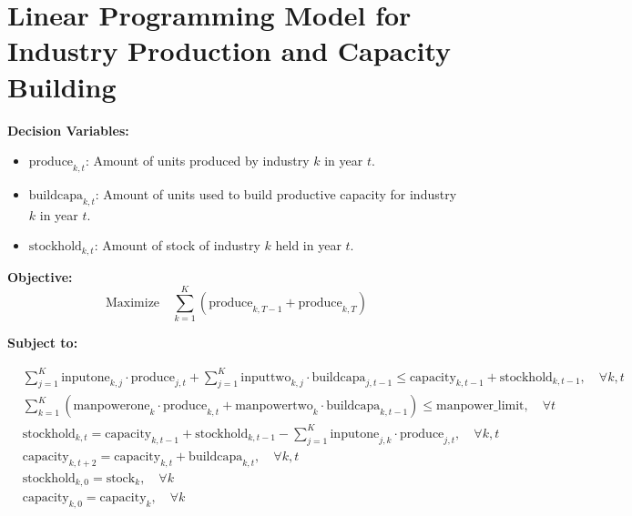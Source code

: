 \documentclass{article}
\begin{document}
\section*{Linear Programming Model for Industry Production and Capacity Building}

\textbf{Decision Variables:}
\begin{itemize}
    \item \( \text{produce}_{k, t} \): Amount of units produced by industry \( k \) in year \( t \).
    \item \( \text{buildcapa}_{k, t} \): Amount of units used to build productive capacity for industry \( k \) in year \( t \).
    \item \( \text{stockhold}_{k, t} \): Amount of stock of industry \( k \) held in year \( t \).
\end{itemize}

\textbf{Objective:}
\[
\text{Maximize} \quad \sum_{k=1}^{K} (\text{produce}_{k, T-1} + \text{produce}_{k, T})
\]

\textbf{Subject to:}

\begin{align}
    & \sum_{j=1}^{K} \text{inputone}_{k, j} \cdot \text{produce}_{j, t} + \sum_{j=1}^{K} \text{inputtwo}_{k, j} \cdot \text{buildcapa}_{j, t-1} \leq \text{capacity}_{k, t-1} + \text{stockhold}_{k, t-1}, \quad \forall k, t \\
    & \sum_{k=1}^{K} (\text{manpowerone}_{k} \cdot \text{produce}_{k, t} + \text{manpowertwo}_{k} \cdot \text{buildcapa}_{k, t-1}) \leq \text{manpower\_limit}, \quad \forall t \\
    & \text{stockhold}_{k, t} = \text{capacity}_{k, t-1} + \text{stockhold}_{k, t-1} - \sum_{j=1}^{K} \text{inputone}_{j, k} \cdot \text{produce}_{j, t}, \quad \forall k, t \\
    & \text{capacity}_{k, t+2} = \text{capacity}_{k, t} + \text{buildcapa}_{k, t}, \quad \forall k, t \\
    & \text{stockhold}_{k, 0} = \text{stock}_{k}, \quad \forall k \\
    & \text{capacity}_{k, 0} = \text{capacity}_{k}, \quad \forall k
\end{align}
\end{document}
